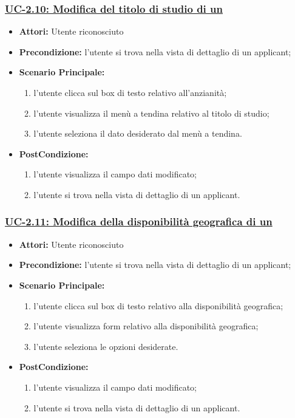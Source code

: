 \subsubsection{\underline{UC-2.10: Modifica del titolo di studio di un \applicant}}
\begin{itemize}
	\item \textbf{Attori:} Utente riconosciuto
	\item \textbf{Precondizione:}  l'utente si trova nella vista di dettaglio di un applicant;
	\item \textbf{Scenario Principale:}
	\begin{enumerate}
		\item l'utente clicca sul box di testo relativo all'anzianità;
		\item l'utente visualizza il menù a tendina relativo al titolo di studio;
		\item l'utente seleziona il dato desiderato dal menù a tendina.
	\end{enumerate}
	\item \textbf{PostCondizione:} 
	\begin{enumerate}
		\item l'utente visualizza il campo dati modificato;
		\item l'utente si trova nella vista di dettaglio di un applicant.
	\end{enumerate}
	
\end{itemize}


\subsubsection{\underline{UC-2.11: Modifica della disponibilità geografica di un \applicant}}
\begin{itemize}
	\item \textbf{Attori:} Utente riconosciuto
	\item \textbf{Precondizione:}  l'utente si trova nella vista di dettaglio di un applicant;
	\item \textbf{Scenario Principale:}
	\begin{enumerate}
		\item l'utente clicca sul box di testo relativo alla disponibilità geografica;
		\item l'utente visualizza form relativo alla disponibilità geografica;
		\item l'utente seleziona le opzioni desiderate.
	\end{enumerate}
	\item \textbf{PostCondizione:} 
	\begin{enumerate}
		\item l'utente visualizza il campo dati modificato;
		\item l'utente si trova nella vista di dettaglio di un applicant.
	\end{enumerate}
	
\end{itemize}

